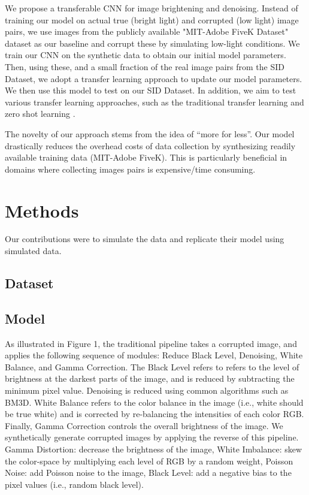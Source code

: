 \documentclass{article}
\begin{document}
We propose a transferable CNN for image brightening and denoising. Instead
of training our model on actual true (bright light) and corrupted
(low light) image pairs, we use images from the publicly available
"MIT-Adobe FiveK Dataset" dataset as our baseline and corrupt these by simulating
low-light conditions. We train our CNN on the synthetic data to obtain our initial
model parameters. Then, using these, and a small fraction of the real image pairs
from the SID Dataset, we adopt a transfer learning \cite{Goodfellow-et-al-2016}
approach to update our model parameters. We then use this model to test on our
SID Dataset. In addition, we aim to test various transfer learning approaches,
such as the traditional transfer learning and zero shot learning \cite{larochelle2008,
  NIPS2009_3650, socher2013zeroshot}.\newline

The novelty of our approach stems from the idea of ``more for less''. Our
model drastically reduces the overhead costs of data collection by
synthesizing readily available training data (MIT-Adobe FiveK). This is
particularly beneficial in domains where collecting images pairs is
expensive/time consuming.

\section{Methods}

Our contributions were to simulate the data and replicate their model
using simulated data.

\subsection{Dataset}

\subsection{Model}

As illustrated in Figure 1, the traditional pipeline takes a corrupted image, and applies the following sequence of modules: Reduce Black Level, Denoising, White Balance, and Gamma Correction. The Black Level refers to refers to the level of brightness at the darkest parts of the image, and is reduced by subtracting the minimum pixel value. Denoising is reduced using common algorithms such as BM3D. White Balance refers to the color balance in the image (i.e., white should be true white) and is corrected by re-balancing the intensities of each color RGB. Finally, Gamma Correction controls the overall brightness of the image. We synthetically generate corrupted images by applying the reverse of this pipeline. Gamma Distortion: decrease the brightness of the image, White Imbalance: skew the color-space by multiplying each level of RGB by a random weight, Poisson Noise: add Poisson noise to the image, Black Level: add a negative bias to the pixel values (i.e., random black level). 
\end{document}
